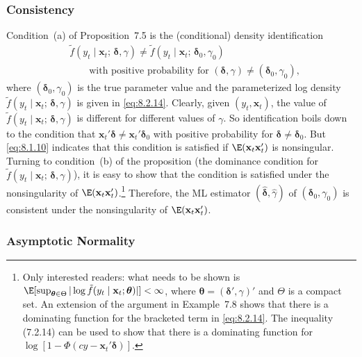 \subsubsection*{Consistency}

Condition~(a) of Proposition~7.5 is the (conditional) density identification
\begin{align*}
  &\tilde{f}(y_t \mid \mathbf{x}_t;\, \boldsymbol{\delta}, \gamma)
   \neq \tilde{f}(y_t \mid \mathbf{x}_t;\, \boldsymbol{\delta}_0, \gamma_0) \\
  &\qquad\text{with positive probability for }
   (\boldsymbol{\delta}, \gamma) \neq (\boldsymbol{\delta}_0, \gamma_0),
\end{align*}
where $(\boldsymbol{\delta}_0, \gamma_0)$ is the true parameter value and the parameterized log density
$\tilde{f}(y_t \mid \mathbf{x}_t;\, \boldsymbol{\delta}, \gamma)$ is given in \eqref{eq:8.2.14}. Clearly, given
$(y_t, \mathbf{x}_t)$, the value of
$\tilde{f}(y_t \mid \mathbf{x}_t;\, \boldsymbol{\delta}, \gamma)$
is different for different values of $\gamma$. So identification boils down to the condition
that $\mathbf{x}_t'\boldsymbol{\delta} \neq \mathbf{x}_t'\boldsymbol{\delta}_0$ with positive probability for
$\boldsymbol{\delta} \neq \boldsymbol{\delta}_0$. But \eqref{eq:8.1.10} indicates that
this condition is satisfied if $\E(\mathbf{x}_t\mathbf{x}_t')$ is nonsingular. Turning to condition~(b) of the
proposition (the dominance condition for
$\tilde{f}(y_t \mid \mathbf{x}_t;\, \boldsymbol{\delta}, \gamma)$), it is easy to show that
the condition is satisfied under the nonsingularity of
$\E(\mathbf{x}_t\mathbf{x}_t')$.\footnote{Only interested readers: what needs to be shown is
$\E[\sup_{\boldsymbol{\theta} \in \Theta} |\log \tilde{f}(y_t \mid \mathbf{x}_t; \boldsymbol{\theta})|] < \infty$,
where $\boldsymbol{\theta} = (\boldsymbol{\delta}', \gamma)'$ and $\Theta$ is a compact set.
An extension of the argument in Example~7.8 shows that there is a dominating
function for the bracketed term in \eqref{eq:8.2.14}. The inequality (7.2.14) can be used to show that there is a dominating
function for $\log[1 - \Phi(cy - \mathbf{x}_t'\boldsymbol{\delta})]$.}
Therefore, the ML
estimator $(\hat{\boldsymbol{\delta}}, \hat{\gamma})$ of $(\boldsymbol{\delta}_0, \gamma_0)$ is consistent under the nonsingularity of $\E(\mathbf{x}_t\mathbf{x}_t')$.

\subsubsection*{Asymptotic Normality}

